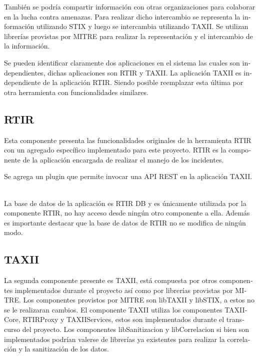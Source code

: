 \documentclass[11pt]{article}
\begin{document}
\foreignlanguage{spanish}{También se podría compartir información con otras organizaciones para colaborar en la lucha
contra amenazas. Para realizar dicho intercambio se representa la información utilizando STIX y luego se intercambia
utilizando TAXII. Se utilizan librerías provistas por MITRE para realizar la representación y el intercambio de la
información.}


\bigskip

\foreignlanguage{spanish}{Se pueden identificar claramente dos aplicaciones en el sistema las cuales son independientes,
dichas aplicaciones son RTIR y TAXII. La aplicación TAXII es independiente de la aplicación RTIR. Siendo posible
reemplazar esta última por otra herramienta con funcionalidades similares.}

\subsection[RTIR]{\foreignlanguage{spanish}{RTIR}}
\foreignlanguage{spanish}{Esta componente presenta las funcionalidades originales de la herramienta RTIR con un agregado
específico implementado para este proyecto. RTIR es la componente de la aplicación encargada de realizar el manejo de
los incidentes.}

\foreignlanguage{spanish}{Se agrega un plugin que permite invocar una API REST en la aplicación TAXII. \ }

%
%
\foreignlanguage{spanish}{La base de datos de la aplicación es RTIR DB y es únicamente utilizada por la componente RTIR,
no hay acceso desde ningún otro componente a ella. Además es importante destacar que la base de datos de RTIR no se
modifica de ningún modo.}


\bigskip

\subsection[TAXII\ \ ]{\foreignlanguage{spanish}{TAXII\ \ }}

\bigskip

\foreignlanguage{spanish}{La segunda componente presente es TAXII, está compuesta por otros componentes implementados
durante el proyecto así como por librerías provistas por MITRE. Los componentes provistos por MITRE son libTAXII y
libSTIX, a estos no se le realizaran cambios. El componente TAXII utiliza los componentes TAXIICore, RTIRProxy y
TAXIIServices, estos son implementados durante el transcurso del proyecto. Los componentes libSanitizacion y
libCorrelacion si bien son implementados podrían valerse de librerías ya existentes para realizar la correlación y la
sanitización de los datos.}
\end{document}

